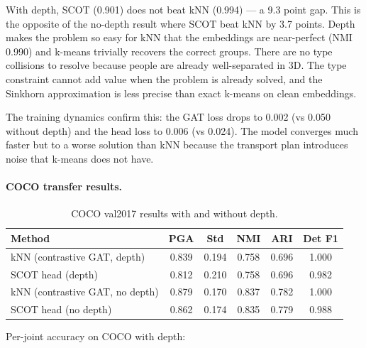 With depth, SCOT (0.901) does not beat kNN (0.994) --- a 9.3 point gap. This is the opposite of the no-depth result where SCOT beat kNN by 3.7 points. Depth makes the problem so easy for kNN that the embeddings are near-perfect (NMI 0.990) and k-means trivially recovers the correct groups. There are no type collisions to resolve because people are already well-separated in 3D. The type constraint cannot add value when the problem is already solved, and the Sinkhorn approximation is less precise than exact k-means on clean embeddings.

The training dynamics confirm this: the GAT loss drops to 0.002 (vs 0.050 without depth) and the head loss to 0.006 (vs 0.024). The model converges much faster but to a worse solution than kNN because the transport plan introduces noise that k-means does not have.

\paragraph{COCO transfer results.}

\begin{table}[H]
\centering
\footnotesize
\begin{tabular}{lccccc}
\toprule
Method & PGA & Std & NMI & ARI & Det F1 \\
\midrule
kNN (contrastive GAT, depth) & 0.839 & 0.194 & 0.758 & 0.696 & 1.000 \\
SCOT head (depth) & 0.812 & 0.210 & 0.758 & 0.696 & 0.982 \\
\midrule
kNN (contrastive GAT, no depth) & 0.879 & 0.170 & 0.837 & 0.782 & 1.000 \\
SCOT head (no depth) & 0.862 & 0.174 & 0.835 & 0.779 & 0.988 \\
\bottomrule
\end{tabular}
\caption{COCO val2017 results with and without depth.}
\end{table}

Per-joint accuracy on COCO with depth:

